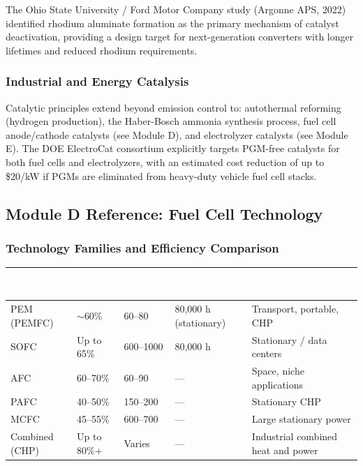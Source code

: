 \documentclass[11pt,letterpaper]{article}
\newcommand{\tableheader}[1]{\textbf{\sffamily\textcolor{white}{#1}}}
\begin{document}
The Ohio State University / Ford Motor Company study (Argonne APS, 2022) identified rhodium aluminate formation as the primary mechanism of catalyst deactivation, providing a design target for next-generation converters with longer lifetimes and reduced rhodium requirements.

\subsubsection{Industrial and Energy Catalysis}
Catalytic principles extend beyond emission control to: autothermal reforming (hydrogen production), the Haber-Bosch ammonia synthesis process, fuel cell anode/cathode catalysts (see Module D), and electrolyzer catalysts (see Module E). The DOE ElectroCat consortium explicitly targets PGM-free catalysts for both fuel cells and electrolyzers, with an estimated cost reduction of up to \$20/kW if PGMs are eliminated from heavy-duty vehicle fuel cell stacks.

\subsection{Module D Reference: Fuel Cell Technology}

\subsubsection{Technology Families and Efficiency Comparison}

\begin{center}
\begin{tabularx}{\textwidth}{L{2.5cm}C{1.8cm}C{1.8cm}C{1.8cm}X}
\toprule
{}
\tableheader{Cell Type} & \tableheader{Elec. Eff.} & \tableheader{Temp. (°C)} & \tableheader{DOE Durability} & \tableheader{Primary Applications} \\
\midrule
PEM (PEMFC) & $\sim$60\% & 60--80 & 80,000 h (stationary) & Transport, portable, CHP \\
SOFC & Up to 65\% & 600--1000 & 80,000 h & Stationary / data centers \\
AFC & 60--70\% & 60--90 & --- & Space, niche applications \\
PAFC & 40--50\% & 150--200 & --- & Stationary CHP \\
MCFC & 45--55\% & 600--700 & --- & Large stationary power \\
Combined (CHP) & Up to 80\%+ & Varies & --- & Industrial combined heat and power \\
\bottomrule
\end{tabularx}
\end{center}
\end{document}
